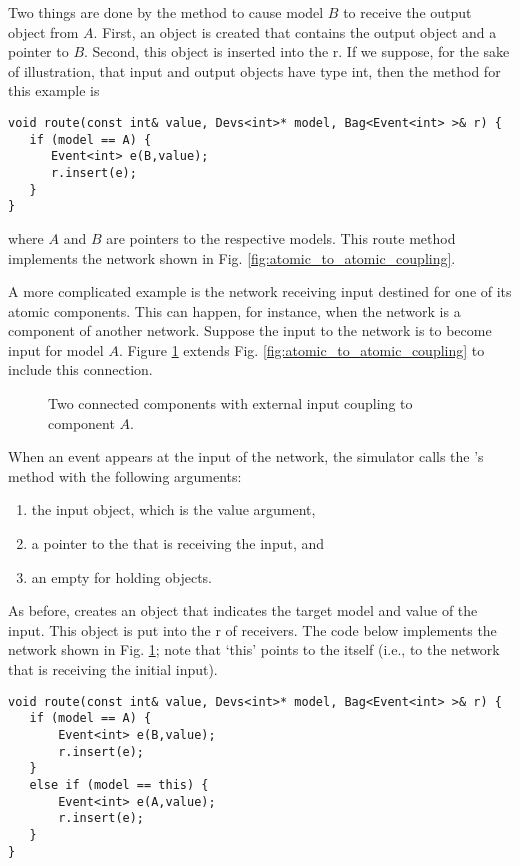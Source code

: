 Two things are done by the  method to cause  model $B$ to receive the output object from $A$. First, an  object is created that contains the output object and a pointer to $B$. Second, this  object is inserted into the  r. If we suppose, for the sake of illustration, that input and output objects have type int, then the  method for this example is
\begin{verbatim}
void route(const int& value, Devs<int>* model, Bag<Event<int> >& r) {
   if (model == A) {
      Event<int> e(B,value);
      r.insert(e);
   }
}
\end{verbatim}
where $A$ and $B$ are pointers to the respective models. This route method implements the network shown in Fig. \ref{fig:atomic_to_atomic_coupling}.

A more complicated example is the network receiving input destined for one of its atomic components. This can happen, for instance, when the network is a component of another network. Suppose the input to the network is to become input for  model $A$. Figure \ref{fig:eic_atomic_to_atomic_coupling} extends Fig. \ref{fig:atomic_to_atomic_coupling} to include this connection.
\begin{figure}[ht]
\centering
{}
\caption{Two connected  components with external input coupling to component $A$.}
\label{fig:eic_atomic_to_atomic_coupling}
\end{figure} 

When an event appears at the input of the network, the simulator calls the 's  method with the following arguments:
\begin{enumerate}
\item the input object, which is the value argument,
\item a pointer to the  that is receiving the input, and
\item an empty  for holding  objects.
\end{enumerate} 
As before,  creates an  object that indicates the target model and value of the input. This  object is put into the  r of receivers. The code below implements the network shown in Fig. \ref{fig:eic_atomic_to_atomic_coupling}; note that `this' points to the  itself (i.e., to the network that is receiving the initial input).
\begin{verbatim}
void route(const int& value, Devs<int>* model, Bag<Event<int> >& r) {
   if (model == A) {
       Event<int> e(B,value);
       r.insert(e);
   }
   else if (model == this) {
       Event<int> e(A,value);
       r.insert(e);
   }
}
\end{verbatim}


